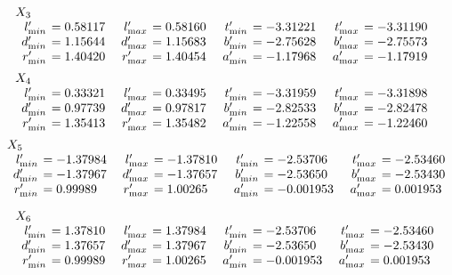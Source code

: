 \begin{remark}
\begin{table}
\begin{small}
$$
\begin{array}{rlrlrlrl}
\noalign{\noindent 
$X_3$}
\noalign{\vskip2pt} l'_{\textrm min} &\hskip-6pt =   0.58117&\enspace   l'_{\textrm max} &\hskip-6pt =   0.58160&\enspace  
t'_{\textrm min} &\hskip-6pt =   -3.31221&\enspace   t'_{\textrm max} &\hskip-6pt =   -3.31190\\
d'_{\textrm min} &\hskip-6pt =   1.15644& d'_{\textrm max}
&\hskip-6pt =   1.15683&  b'_{\textrm min} &\hskip-6pt =   -2.75628& b'_{\textrm max} &\hskip-6pt =   -2.75573\\
r'_{\textrm min} &\hskip-6pt =   1.40420&
r'_{\textrm max} &\hskip-6pt =   1.40454&  a'_{\textrm min} &\hskip-6pt =   -1.17968& a'_{\textrm max} &\hskip-6pt =   -1.17919
\end{array}
$$
$$
\begin{array}{rlrlrlrl}
\noalign{\noindent 
$X_4$}
\noalign{\vskip2pt}
l'_{\textrm min} &\hskip-6pt = 0.33321&\enspace   l'_{\textrm max} &\hskip-6pt = 0.33495&\enspace  
t'_{\textrm min} &\hskip-6pt = -3.31959&\enspace   t'_{\textrm max}&\hskip-6pt = -3.31898\\
d'_{\textrm min} &\hskip-6pt = 0.97739& d'_{\textrm max}
&\hskip-6pt = 0.97817&  b'_{\textrm min} &\hskip-6pt = -2.82533& b'_{\textrm max} &\hskip-6pt = -2.82478\\
r'_{\textrm min} &\hskip-6pt = 1.35413&
r'_{\textrm max} &\hskip-6pt = 1.35482&  a'_{\textrm min} &\hskip-6pt = -1.22558& a'_{\textrm max} &\hskip-6pt = -1.22460\end{array}$$
$$\begin{array}{rlrlrlrl}
\noalign{\noindent 
$X_5$}
\noalign{\vskip2pt}
l'_{\textrm min} &\hskip-6pt = -1.37984&\enspace   l'_{\textrm max}&\hskip-6pt = -1.37810&\enspace  
t'_{\textrm min} &\hskip-6pt = -2.53706&\enspace   t'_{\textrm max} &\hskip-6pt = -2.53460\\
d'_{\textrm min} &\hskip-6pt = -1.37967& d'_{\textrm max}
&\hskip-6pt = -1.37657&  b'_{\textrm min}&\hskip-6pt = -2.53650& b'_{\textrm max} &\hskip-6pt = -2.53430\\
r'_{\textrm min} &\hskip-6pt = 0.99989&
r'_{\textrm max} &\hskip-6pt = 1.00265&  a'_{\textrm min} &\hskip-6pt = -0.001953& a'_{\textrm max} &\hskip-6pt = 0.001953\end{array}$$

$$\begin{array}{rlrlrlrl}
\noalign{\noindent 
$X_6$}
\noalign{\vskip2pt}
l'_{\textrm min} &\hskip-6pt = 1.37810&\enspace   l'_{\textrm max}&\hskip-6pt = 1.37984&\enspace  
t'_{\textrm min} &\hskip-6pt = -2.53706&\enspace   t'_{\textrm max} &\hskip-6pt = -2.53460\\
d'_{\textrm min} &\hskip-6pt = 1.37657& d'_{\textrm max}
&\hskip-6pt = 1.37967& b'_{\textrm min} &\hskip-6pt = -2.53650& b'_{\textrm max}&\hskip-6pt = -2.53430\\
r'_{\textrm min} &\hskip-6pt = 0.99989&
r'_{\textrm max} &\hskip-6pt = 1.00265&  a'_{\textrm min} &\hskip-6pt = -0.001953& a'_{\textrm max} &\hskip-6pt = 0.001953
\end{array}$$
\end{small}
 \end{table}


\end{remark}
